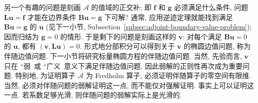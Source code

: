 另一个有趣的问题是刻画 $\mathcal{A}$ 的值域的正交补; 即 $\bm{f}$ 和 $\bm{g}$ 必须满足什么条件, 问题 $\bm{L}\bm{u}=\bm{f}$ 才能在边界条件 $\bm{B}\bm{u}=\bm{g}$ 下可解? 通常, 应用逆迹定理就能找到满足 $\bm{B}\bm{u}=\bm{g}$ 的 $\bm{u}$ (见下一小节, Subsection~\ref{subsec:adjoint-boundary-value-problem}); 因而归结为 $\bm{g}=0$ 的情形. 于是剩下的问题是刻画这样的 $\bm{v}$: 对每个满足 $\bm{B}\bm{u}=0$ 的 $\bm{u}$, 都有 $(\bm{v},\bm{L}\bm{u})=0$. 形式地分部积分可以得到关于 $\bm{v}$ 的椭圆边值问题, 称为伴随边值问题. 下一小节将研究标量椭圆方程的伴随边值问题. 当然, 先验而言, $\bm{v}$ 只在 ``弱\textquotesingle\textquotesingle\ 或 ``广义\textquotesingle\textquotesingle\ 意义下满足伴随边值问题. 因此弱解的正则性再次成为重要问题. 特别地, 为证明算子 $\mathcal{A}$ 为 Fredholm 算子, 必须证明伴随算子的零空间有限维. 当然, 必须对伴随问题的弱解证明这一点, 而不能仅对强解证明. 事实上可以证明这一点. 若系数足够光滑, 则伴随问题的弱解实际上是光滑的.
